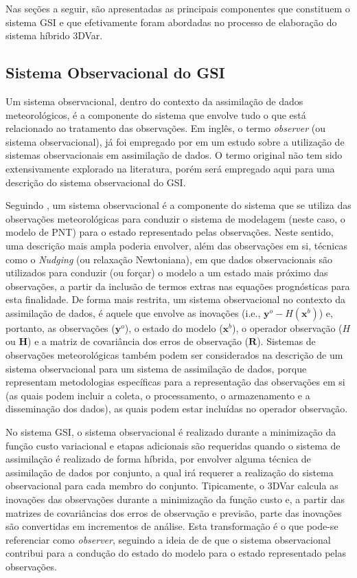 Nas seções a seguir, são apresentadas as principais componentes que constituem o sistema GSI e que efetivamente foram abordadas no processo de elaboração do sistema híbrido 3DVar.

\subsection{Sistema Observacional do GSI}

Um sistema observacional, dentro do contexto da assimilação de dados meteorológicos, é a componente do sistema que envolve tudo o que está relacionado ao tratamento das observações. Em inglês, o termo \textit{observer} (ou sistema observacional), já foi empregado por  em um estudo sobre a utilização de sistemas observacionais em assimilação de dados. O termo original não tem sido extensivamente explorado na literatura, porém será empregado aqui para uma descrição do sistema observacional do GSI. 

Seguindo , um sistema observacional é a componente do sistema que se utiliza das observações meteorológicas para conduzir o sistema de modelagem (neste caso, o modelo de PNT) para o estado representado pelas observações. Neste sentido, uma descrição mais ampla poderia envolver, além das observações em si, técnicas como o \textit{Nudging} (ou relaxação Newtoniana), em que dados observacionais são utilizados para conduzir (ou forçar) o modelo a um estado mais próximo das observações, a partir da inclusão de termos extras nas equações prognósticas para esta finalidade. De forma mais restrita, um sistema observacional no contexto da assimilação de dados, é aquele que envolve as inovações (i.e., $\mathbf{y}^{o}-\textit{H}(\mathbf{x}^{b})$) e, portanto, as observações ($\mathbf{y}^{o}$), o estado do modelo ($\mathbf{x}^{b}$), o operador observação ($H$ ou $\mathbf{H}$) e a matriz de covariância dos erros de observação ($\mathbf{R}$). Sistemas de observações meteorológicas também podem ser considerados na descrição de um sistema observacional para um sistema de assimilação de dados, porque representam metodologias específicas para a representação das observações em si (as quais podem incluir a coleta, o processamento, o armazenamento e a disseminação dos dados), as quais podem estar incluídas no operador observação.

No sistema GSI, o sistema observacional é realizado durante a minimização da função custo variacional e etapas adicionais são requeridas quando o sistema de assimilação é realizado de forma híbrida, por envolver alguma técnica de assimilação de dados por conjunto, a qual irá requerer a realização do sistema observacional para cada membro do conjunto. Tipicamente, o 3DVar calcula as inovações das observações durante a minimização da função custo e, a partir das matrizes de covariâncias dos erros de observação e previsão, parte das inovações são convertidas em incrementos de análise. Esta transformação é o que pode-se referenciar como \textit{observer}, seguindo a ideia de  de que o sistema observacional contribui para a condução do estado do modelo para o estado representado pelas observações.

